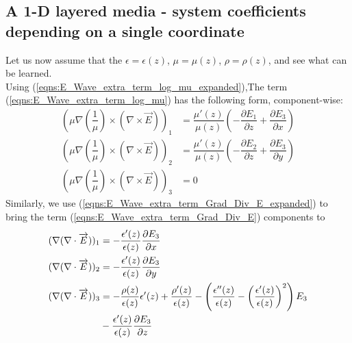 \documentclass[12pt,twoside]{report}
\begin{document}
\subsection{A 1-D layered media - system coefficients depending on a single coordinate}

Let us now assume that the $\epsilon = \epsilon(z)$, $\mu=\mu(z)$, $\rho = \rho(z)$, and see what can be learned.\\
Using (\ref{eqns:E_Wave_extra_term_log_mu_expanded}),The term (\ref{eqns:E_Wave_extra_term_log_mu}) has the following form, component-wise:
\begin{subequations}
\begin{align}
\left(  \mu \nabla \left(\dfrac{1}{\mu} \right)  \times \left(\nabla \times \overrightarrow{E} \right)\right)_1 &= \dfrac{\mu'(z)}{\mu(z)}\left( -\dfrac{\partial E_1}{\partial z} + \dfrac{\partial E_3}{\partial x}\right) \label{eqns:LogTerm_z_only_Eq1}\\
\left(  \mu \nabla \left( \dfrac{1}{\mu} \right)  \times \left(\nabla \times \overrightarrow{E} \right)\right)_2 &= \dfrac{\mu'(z)}{\mu(z)}\left( -\dfrac{\partial E_2}{\partial z} + \dfrac{\partial E_3}{\partial y}\right) \label{eqns:LogTerm_z_only_Eq2} \\
\left(  \mu \nabla \left( \dfrac{1}{\mu} \right)  \times \left(\nabla \times \overrightarrow{E} \right)\right)_3 &= 0 \label{eqns:LogTerm_z_only_Eq3}
\end{align}
\end{subequations}
Similarly, we use (\ref{eqns:E_Wave_extra_term_Grad_Div_E_expanded}) to bring the term (\ref{eqns:E_Wave_extra_term_Grad_Div_E}) components to
\begin{subequations}
\begin{align}
(\nabla (\nabla \cdot \overrightarrow{E}))_1 &= -\dfrac{\epsilon'(z)}{\epsilon(z)} \dfrac{\partial E_3}{\partial x}	\label{eqns:GradDivTerm_z_only_Eq1}\\
(\nabla (\nabla \cdot \overrightarrow{E}))_2 &= -\dfrac{\epsilon'(z)}{\epsilon(z)} \dfrac{\partial E_3}{\partial y} \label{eqns:GradDivTerm_z_only_Eq2}\\
(\nabla (\nabla \cdot \overrightarrow{E}))_3 &= -\dfrac{\rho(z)}{\epsilon(z)}\epsilon'(z) + \dfrac{\rho'(z)}{\epsilon(z)}-\left( \dfrac{\epsilon''(z)}{\epsilon(z)}-\left( \dfrac{\epsilon'(z)}{\epsilon(z)}\right)^2 \right)E_3 \label{eqns:GradDivTerm_z_only_Eq3}\\
& -\dfrac{\epsilon'(z)}{\epsilon(z)}\dfrac{\partial E_3}{\partial z}	\notag
\end{align}
\end{subequations}
\end{document}
